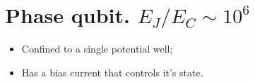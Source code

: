 \newpage\section{Phase qubit. $ E_J/E_C \sim 10^6 $}
 
 
 \begin{itemize}
 	\item Confined to a single potential well;
 	\item Has a bias current that controls it's state.
 \end{itemize}
 
 \newpage